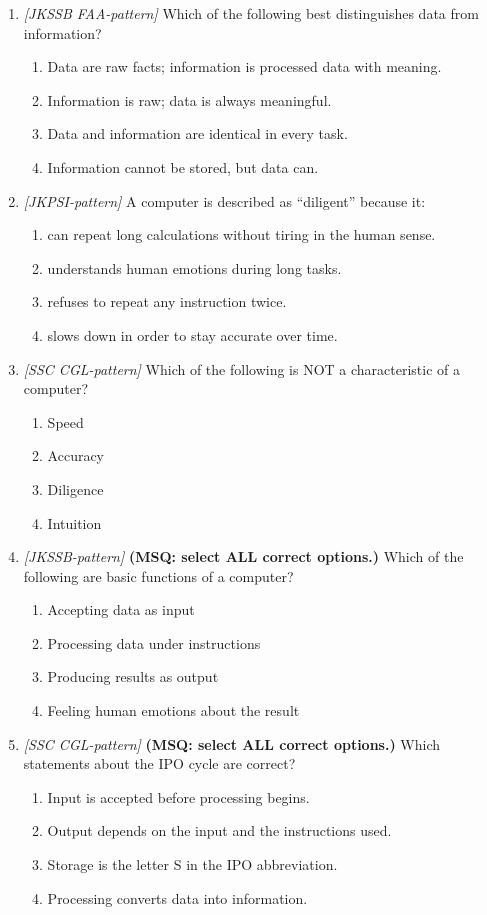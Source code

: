 \documentclass[11pt]{article}
\begin{document}
\begin{enumerate}[label=\textbf{Q\arabic*.}, leftmargin=*]
\item \textit{[JKSSB FAA-pattern]} Which of the following best distinguishes data from information?
  \begin{enumerate}[label=\Alph*.]
    \item Data are raw facts; information is processed data with meaning.
    \item Information is raw; data is always meaningful.
    \item Data and information are identical in every task.
    \item Information cannot be stored, but data can.
  \end{enumerate}
\item \textit{[JKPSI-pattern]} A computer is described as ``diligent'' because it:
  \begin{enumerate}[label=\Alph*.]
    \item can repeat long calculations without tiring in the human sense.
    \item understands human emotions during long tasks.
    \item refuses to repeat any instruction twice.
    \item slows down in order to stay accurate over time.
  \end{enumerate}
\item \textit{[SSC CGL-pattern]} Which of the following is NOT a characteristic of a computer?
  \begin{enumerate}[label=\Alph*.]
    \item Speed
    \item Accuracy
    \item Diligence
    \item Intuition
  \end{enumerate}
\item \textit{[JKSSB-pattern]} \textbf{(MSQ: select ALL correct options.)} Which of the following are basic functions of a computer?
  \begin{enumerate}[label=\Alph*.]
    \item Accepting data as input
    \item Processing data under instructions
    \item Producing results as output
    \item Feeling human emotions about the result
  \end{enumerate}
\item \textit{[SSC CGL-pattern]} \textbf{(MSQ: select ALL correct options.)} Which statements about the IPO cycle are correct?
  \begin{enumerate}[label=\Alph*.]
    \item Input is accepted before processing begins.
    \item Output depends on the input and the instructions used.
    \item Storage is the letter S in the IPO abbreviation.
    \item Processing converts data into information.
  \end{enumerate}
\end{enumerate}
\def\JKSSBLessonID{1}\def\JKSSBAnswers{0}
\end{document}
